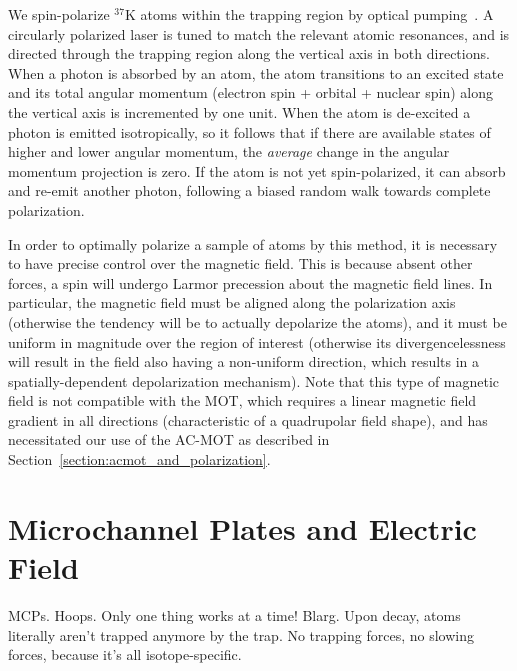 



We spin-polarize $^{37}\textrm{K}$ atoms within the trapping region by optical pumping~\cite{ben_OP}.  A circularly polarized laser is tuned to match the relevant atomic resonances, and is directed through the trapping region along the vertical axis in both directions.  When a photon is absorbed by an atom, the atom transitions to an excited state and its total angular momentum (electron spin + orbital + nuclear spin) along the vertical axis is incremented by one unit.  When the atom is de-excited a photon is emitted isotropically, 
so it follows that if there are available states of higher and lower angular momentum, the \emph{average} change in the angular momentum projection is zero.  If the atom is not yet spin-polarized, it can absorb and re-emit another photon, following a biased random walk towards complete polarization.  



In order to optimally polarize a sample of atoms by this method, it is necessary to have precise control over the magnetic field.  This is because absent other forces, a spin will undergo Larmor precession about the magnetic field lines.  In particular, the magnetic field must be aligned along the polarization axis (otherwise the tendency will be to actually depolarize the atoms), and it must be uniform in magnitude over the region of interest (otherwise its divergencelessness will result in the field also having a non-uniform direction, which results in a spatially-dependent depolarization mechanism).  Note that this type of magnetic field is not compatible with the MOT, which requires a linear magnetic field gradient in all directions (characteristic of a quadrupolar field shape), and has necessitated our use of the AC-MOT as described in Section~\ref{section:acmot_and_polarization}.



\section{Microchannel Plates and Electric Field}
\label{section:mcps}
MCPs.  Hoops.  Only one thing works at a time!  Blarg.  Upon decay, atoms literally aren't trapped anymore by the trap.  No trapping forces, no slowing forces, because it's all isotope-specific.

